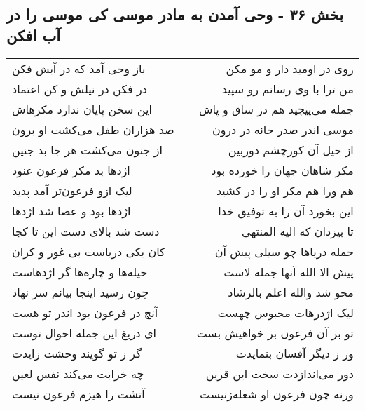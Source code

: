 \begin{center}
\section*{بخش ۳۶ - وحی آمدن به مادر موسی کی موسی را در آب افکن}
\label{sec:sh036}
\begin{longtable}{l p{0.5cm} r}
باز وحی آمد که در آبش فکن
&&
روی در اومید دار و مو مکن
\\
در فکن در نیلش و کن اعتماد
&&
من ترا با وی رسانم رو سپید
\\
این سخن پایان ندارد مکرهاش
&&
جمله می‌پیچید هم در ساق و پاش
\\
صد هزاران طفل می‌کشت او برون
&&
موسی اندر صدر خانه در درون
\\
از جنون می‌کشت هر جا بد جنین
&&
از حیل آن کورچشم دوربین
\\
اژدها بد مکر فرعون عنود
&&
مکر شاهان جهان را خورده بود
\\
لیک ازو فرعون‌تر آمد پدید
&&
هم ورا هم مکر او را در کشید
\\
اژدها بود و عصا شد اژدها
&&
این بخورد آن را به توفیق خدا
\\
دست شد بالای دست این تا کجا
&&
تا بیزدان که الیه المنتهی
\\
کان یکی دریاست بی غور و کران
&&
جمله دریاها چو سیلی پیش آن
\\
حیله‌ها و چاره‌ها گر اژدهاست
&&
پیش الا الله آنها جمله لاست
\\
چون رسید اینجا بیانم سر نهاد
&&
محو شد والله اعلم بالرشاد
\\
آنچ در فرعون بود اندر تو هست
&&
لیک اژدرهات محبوس چهست
\\
ای دریغ این جمله احوال توست
&&
تو بر آن فرعون بر خواهیش بست
\\
گر ز تو گویند وحشت زایدت
&&
ور ز دیگر آفسان بنمایدت
\\
چه خرابت می‌کند نفس لعین
&&
دور می‌اندازدت سخت این قرین
\\
آتشت را هیزم فرعون نیست
&&
ورنه چون فرعون او شعله‌زنیست
\\
\end{longtable}
\end{center}
